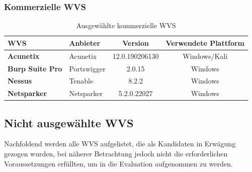 \documentclass[12pt,oneside,a4paper,parskip]{scrbook}
\begin{document}
    \subsubsection{Kommerzielle WVS}
      \begin{table}[H]
        \centering
          \begin{tabular}{|p{4cm}|l|c|c|}
            \hline
            \textbf{WVS}            & \textbf{Anbieter} & \textbf{Version} & \textbf{Verwendete Plattform}  \\
            \hline
            \textbf{Acunetix}       & Acunetix          & 12.0.190206130   & Windows/Kali                          \\
            \hline
            \textbf{Burp Suite Pro} & Portswigger       & 2.0.15           & Windows                       \\
            \hline
            \textbf{Nessus}         & Tenable           & 8.2.2            & Windows                       \\
            \hline
            \textbf{Netsparker}     & Netsparker        & 5.2.0.22027      & Windows                       \\
            \hline
          \end{tabular}
        \caption[Ausgewählte kommerzielle WVS]{Ausgewählte kommerzielle WVS}
      \end{table}
\newpage
  \subsection{Nicht ausgewählte WVS}
    Nachfoldend werden alle WVS aufgelistet, die als Kandidaten in Erwägung gezogen wurden, bei näherer Betrachtung jedoch nicht die erforderlichen Voraussetzungen erfüllten, um in die Evaluation aufgenommen zu werden.
\end{document}
